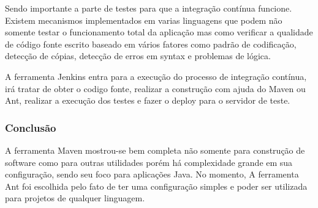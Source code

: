 \documentclass[12pt,a4paper]{article}
\begin{document}
			Sendo importante a parte de testes para que a integração contínua funcione. Existem mecanismos implementados em
			varias linguagens que podem não somente testar o funcionamento total da aplicação mas como verificar a qualidade de
			código fonte escrito baseado em vários fatores como padrão de codificação, detecção de cópias, detecção de erros em
			syntax e problemas de lógica.
			
			A ferramenta Jenkins entra para a execução do processo de integração contínua, irá tratar de obter o codigo fonte,
			realizar a construção com ajuda do Maven ou Ant, realizar a execução dos testes e fazer o deploy para o servidor de
			teste.
			
		
		\subsubsection{Conclusão}
		
			A ferramenta Maven mostrou-se bem completa não somente para construção de software como para outras utilidades porém
			há complexidade grande em sua configuração, sendo seu foco para aplicações Java. No momento, A ferramenta Ant foi
			escolhida pelo fato de ter uma configuração simples e poder ser utilizada para projetos de qualquer linguagem.
	
\end{document}
